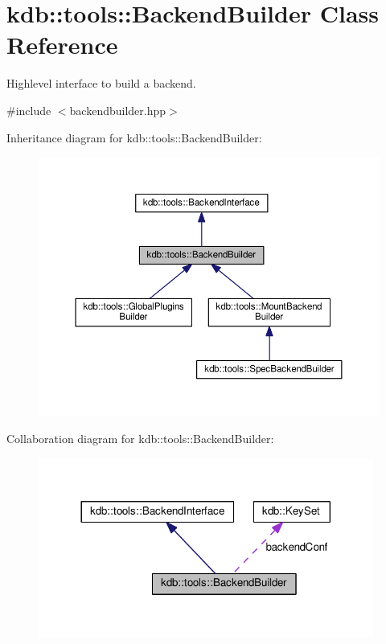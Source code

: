 \hypertarget{classkdb_1_1tools_1_1BackendBuilder}{}\section{kdb\+:\+:tools\+:\+:Backend\+Builder Class Reference}
\label{classkdb_1_1tools_1_1BackendBuilder}


Highlevel interface to build a backend.  




{\ttfamily \#include $<$backendbuilder.\+hpp$>$}



Inheritance diagram for kdb\+:\+:tools\+:\+:Backend\+Builder\+:
\nopagebreak
\begin{figure}[H]
\begin{center}
\leavevmode
\includegraphics[width=350pt]{classkdb_1_1tools_1_1BackendBuilder__inherit__graph}
\end{center}
\end{figure}


Collaboration diagram for kdb\+:\+:tools\+:\+:Backend\+Builder\+:
\nopagebreak
\begin{figure}[H]
\begin{center}
\leavevmode
\includegraphics[width=312pt]{classkdb_1_1tools_1_1BackendBuilder__coll__graph}
\end{center}
\end{figure}
